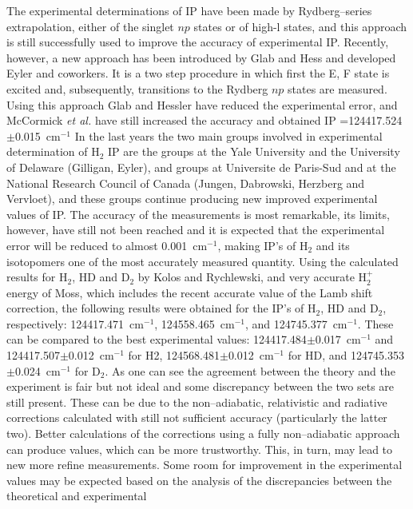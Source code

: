 The experimental determinations of IP have been made
by Rydberg--series extrapolation, either of the singlet
$np$ states or of high-l states, and this approach is still
successfully used to improve the accuracy of experimental IP.
Recently, however, a new approach has been introduced by Glab and
Hess\cite{k52} and developed  Eyler and coworkers.\cite{k53}
It is a two step procedure in which first the E, F state
is excited and, subsequently, transitions to the
Rydberg $np$ states are measured.  Using this approach Glab
and Hessler\cite{k52} have reduced the experimental error, and
McCormick {\it et al.}\cite{k53} have still increased the accuracy
and obtained IP =124417.524$\pm$0.015~cm$^{-1}$
In the last years the two main groups involved in experimental
determination of H$_2$ IP are the groups at the Yale University
and the University of Delaware (Gilligan, Eyler), and groups
at Universite de Paris-Sud and at the National Research Council
of Canada (Jungen, Dabrowski, Herzberg and Vervloet),\cite{k57}
and these groups continue producing new improved experimental
values of IP. The accuracy of the measurements is most remarkable, its
limits, however, have still not been reached and it is
expected\cite{k42p} that the experimental error will be reduced
to almost 0.001~cm$^{-1}$, making IP's of H$_2$ and its
isotopomers one of the most accurately measured quantity.
Using the  calculated
results for H$_2$, HD and D$_2$ by Kolos and Rychlewski,\cite{k12}
and very accurate H$_2^+$ energy of Moss,\cite{k58}
which includes the recent accurate value of the Lamb shift
correction,\cite{k59} the following results were obtained
for the IP's of H$_2$, HD and D$_2$, respectively:
124417.471~cm$^{-1}$, 124558.465~cm$^{-1}$, and 124745.377~cm$^{-1}$.
\cite{kk}
These can be compared to the best experimental values:
124417.484$\pm$0.017~cm$^{-1}$ and 124417.507$\pm$0.012~cm$^{-1}$
for H2,\cite{k42,k57} 124568.481$\pm$0.012~cm$^{-1}$ for HD,\cite{k42}
and 124745.353$\pm$0.024~cm$^{-1}$ for D$_2$.
As one can see the agreement between the theory and the
experiment is fair but not ideal and some discrepancy between
the two sets are still present. These can be due to the
non--adiabatic, relativistic and radiative corrections
calculated with still not sufficient accuracy (particularly the
latter two). Better calculations of the corrections using
a fully non--adiabatic approach can produce values, which can
be more trustworthy. This, in turn, may lead to new more refine
measurements.
Some room for improvement in the experimental
values may be expected based on the analysis
of the discrepancies between the theoretical and experimental
